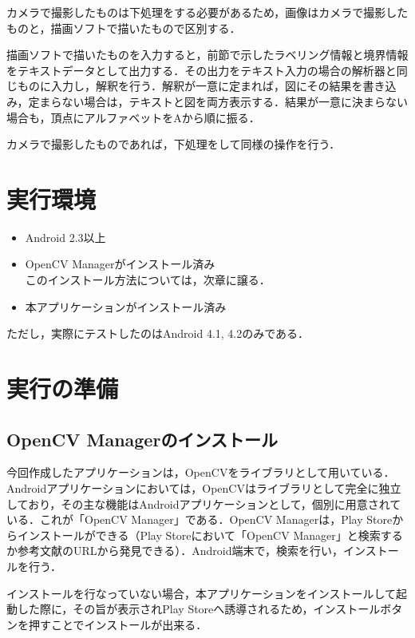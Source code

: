 \documentclass{jarticle}
\begin{document}
カメラで撮影したものは下処理をする必要があるため，画像はカメラで撮影したものと，描画ソフトで描いたもので区別する．

描画ソフトで描いたものを入力すると，前節で示したラベリング情報と境界情報をテキストデータとして出力する．その出力をテキスト入力の場合の解析器と同じものに入力し，解釈を行う．解釈が一意に定まれば，図にその結果を書き込み，定まらない場合は，テキストと図を両方表示する．結果が一意に決まらない場合も，頂点にアルファベットをAから順に振る．

カメラで撮影したものであれば，下処理をして同様の操作を行う．






\section{実行環境}

\begin{itemize}
	\item Android 2.3以上
	\item OpenCV Manager\cite{ref:opecv_manager}がインストール済み\\
	このインストール方法については，次章に譲る．
	\item 本アプリケーションがインストール済み
\end{itemize}
ただし，実際にテストしたのはAndroid 4.1, 4.2のみである．





\section{実行の準備}

\subsection{OpenCV Managerのインストール}
今回作成したアプリケーションは，OpenCV\cite{ref:opencv_honke}をライブラリとして用いている．Androidアプリケーションにおいては，OpenCVはライブラリとして完全に独立しており，その主な機能はAndroidアプリケーションとして，個別に用意されている．これが「OpenCV Manager」である．OpenCV Managerは，Play Storeからインストールができる（Play Storeにおいて「OpenCV Manager」と検索するか参考文献のURLから発見できる）\cite{ref:opecv_manager}．Android端末で，検索を行い，インストールを行う．

インストールを行なっていない場合，本アプリケーションをインストールして起動した際に，その旨が表示されPlay Storeへ誘導されるため，インストールボタンを押すことでインストールが出来る．
\end{document}
